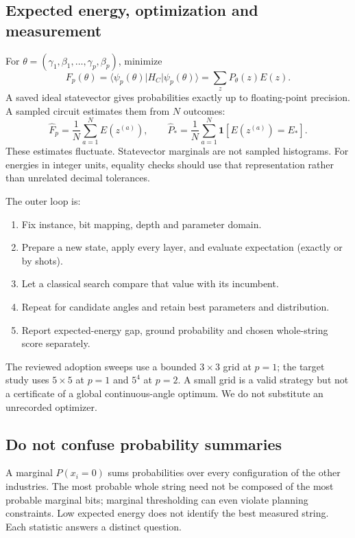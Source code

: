 \documentclass[11pt,letterpaper]{article}
\newcommand{\ket}[1]{\lvert #1\rangle}
\newcommand{\bra}[1]{\langle #1\rvert}
\begin{document}
\subsection{Expected energy, optimization and measurement}\label{sec:outerloop}
For $\theta=(\gamma_1,\beta_1,\ldots,\gamma_p,\beta_p)$, minimize
\begin{equation}
 F_p(\theta)=\bra{\psi_p(\theta)}H_C\ket{\psi_p(\theta)}
 =\sum_zP_\theta(z)E(z).
\end{equation}
A saved ideal statevector gives probabilities exactly up to floating-point precision. A sampled circuit estimates them from $N$ outcomes:
\begin{equation}
 \widehat F_p=\frac1N\sum_{a=1}^NE(z^{(a)}),\qquad
 \widehat P_*=\frac1N\sum_{a=1}^N\mathbf1[E(z^{(a)})=E_*].
\end{equation}
These estimates fluctuate. Statevector marginals are not sampled histograms. For energies in integer units, equality checks should use that representation rather than unrelated decimal tolerances.

The outer loop is:
\begin{enumerate}
 \item Fix instance, bit mapping, depth and parameter domain.
 \item Prepare a new state, apply every layer, and evaluate expectation (exactly or by shots).
 \item Let a classical search compare that value with its incumbent.
 \item Repeat for candidate angles and retain best parameters and distribution.
 \item Report expected-energy gap, ground probability and chosen whole-string score separately.
\end{enumerate}
The reviewed adoption sweeps use a bounded $3\times3$ grid at $p=1$; the target study uses $5\times5$ at $p=1$ and $5^4$ at $p=2$. A small grid is a valid strategy but not a certificate of a global continuous-angle optimum. We do not substitute an unrecorded optimizer.

\subsection{Do not confuse probability summaries}
A marginal $P(x_i=0)$ sums probabilities over every configuration of the other industries. The most probable whole string need not be composed of the most probable marginal bits; marginal thresholding can even violate planning constraints. Low expected energy does not identify the best measured string. Each statistic answers a distinct question.
\end{document}
